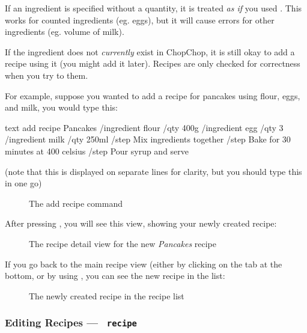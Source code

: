 	If an ingredient is specified without a quantity, it is treated \emph{as if} you used . This works for
	counted ingredients (eg. eggs), but it will cause errors for other ingredients (eg. volume of milk).

	If the ingredient does not \emph{currently} exist in ChopChop, it is still okay to add a recipe using it (you might add it later).
	Recipes are only checked for correctness when you try to \hyperlink{MakeRecipeCommand}{} them.

	For example, suppose you wanted to add a recipe for pancakes using flour, eggs, and milk, you would type this:

	\begin{blockofcode}{text}
		add recipe Pancakes
			/ingredient flour /qty 400g
			/ingredient egg /qty 3
			/ingredient milk /qty 250ml
			/step Mix ingredients together
			/step Bake for 30 minutes at 400 celsius
			/step Pour syrup and serve
	\end{blockofcode}

	(note that this is displayed on separate lines for clarity, but you should type this in one go)

	\pagebreak
	\begin{figure}[!htbp]\centering\ContinuedFloat*
		\caption{The add recipe command}
	\end{figure}

	After pressing , you will see this view, showing your newly created recipe:

	\begin{figure}[!htbp]\centering\ContinuedFloat
		\caption{The recipe detail view for the new \emph{Pancakes} recipe}
	\end{figure}

	If you go back to the main recipe view (either by clicking on the tab at the bottom, or by using ,
	you can see the new recipe in the list:

	\begin{figure}[!htbp]\centering\ContinuedFloat
		\caption{The newly created recipe in the recipe list}
	\end{figure}




\pagebreak
\hypertarget{EditRecipeCommand}{}
\subsubsection{Editing Recipes — \texttt{ recipe}}

